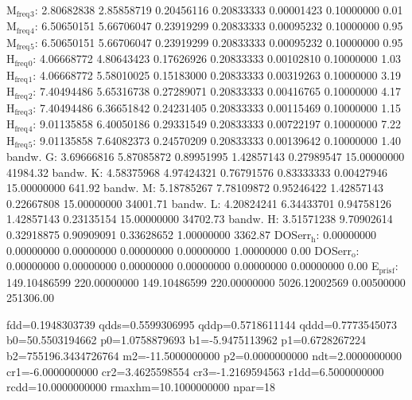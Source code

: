 \documentclass[11pt]{article}
\begin{document}
M\(_{\text{freq}}\)\(_{\text{3}}\):   2.80682838   2.85858719   0.20456116   0.20833333   0.00001423   0.10000000         0.01
M\(_{\text{freq}}\)\(_{\text{4}}\):   6.50650151   5.66706047   0.23919299   0.20833333   0.00095232   0.10000000         0.95
M\(_{\text{freq}}\)\(_{\text{5}}\):   6.50650151   5.66706047   0.23919299   0.20833333   0.00095232   0.10000000         0.95
H\(_{\text{freq}}\)\(_{\text{0}}\):   4.06668772   4.80643423   0.17626926   0.20833333   0.00102810   0.10000000         1.03
H\(_{\text{freq}}\)\(_{\text{1}}\):   4.06668772   5.58010025   0.15183000   0.20833333   0.00319263   0.10000000         3.19
H\(_{\text{freq}}\)\(_{\text{2}}\):   7.40494486   5.65316738   0.27289071   0.20833333   0.00416765   0.10000000         4.17
H\(_{\text{freq}}\)\(_{\text{3}}\):   7.40494486   6.36651842   0.24231405   0.20833333   0.00115469   0.10000000         1.15
H\(_{\text{freq}}\)\(_{\text{4}}\):   9.01135858   6.40050186   0.29331549   0.20833333   0.00722197   0.10000000         7.22
H\(_{\text{freq}}\)\(_{\text{5}}\):   9.01135858   7.64082373   0.24570209   0.20833333   0.00139642   0.10000000         1.40
bandw. G:   3.69666816   5.87085872   0.89951995   1.42857143   0.27989547  15.00000000     41984.32
bandw. K:   4.58375968   4.97424321   0.76791576   0.83333333   0.00427946  15.00000000       641.92
bandw. M:   5.18785267   7.78109872   0.95246422   1.42857143   0.22667808  15.00000000     34001.71
bandw. L:   4.20824241   6.34433701   0.94758126   1.42857143   0.23135154  15.00000000     34702.73
bandw. H:   3.51571238   9.70902614   0.32918875   0.90909091   0.33628652   1.00000000      3362.87
DOSerr\(_{\text{h}}\):   0.00000000   0.00000000   0.00000000   0.00000000   0.00000000   1.00000000         0.00
DOSerr\(_{\text{o}}\):   0.00000000   0.00000000   0.00000000   0.00000000   0.00000000   0.00000000         0.00
E\(_{\text{pris}}\)\(_{\text{f}}\): 149.10486599 220.00000000 149.10486599 220.00000000 5026.12002569   0.00500000    251306.00

fdd=0.1948303739 qdds=0.5599306995 qddp=0.5718611144 qddd=0.7773545073 b0=50.5503194662 p0=1.0758879693 b1=-5.9475113962 p1=0.6728267224 b2=755196.3434726764 m2=-11.5000000000 p2=0.0000000000 ndt=2.0000000000 cr1=-6.0000000000 cr2=3.4625598554 cr3=-1.2169594563 r1dd=6.5000000000 rcdd=10.0000000000 rmaxhm=10.1000000000 npar=18 
\end{document}
